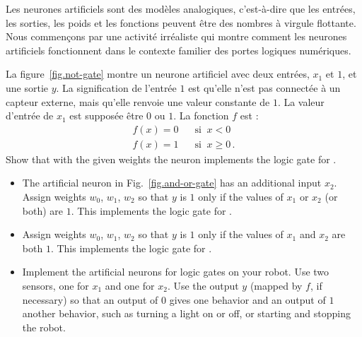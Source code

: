 Les neurones artificiels sont des modèles analogiques, c'est-à-dire que les entrées, les sorties, les poids et les fonctions peuvent être des nombres à virgule flottante. Nous commençons par une activité irréaliste qui montre comment les neurones artificiels fonctionnent dans le contexte familier des portes logiques numériques.

La figure~\ref{fig.not-gate} montre un neurone artificiel avec deux entrées, $x_1$ et $1$, et une sortie $y$. La signification de l'entrée $1$ est qu'elle n'est pas connectée à un capteur externe, mais qu'elle renvoie une valeur constante de $1$. La valeur d'entrée de $x_1$ est supposée être $0$ ou $1$. La fonction $f$ est :
\[
\begin{array}{ll}
f(x) = 0 & \;\;\;\textrm{si} \;\; x < 0\\
f(x) = 1 & \;\;\;\textrm{si} \;\; x \geq 0\,.
\end{array}
\]
Show that with the given weights the neuron implements the logic gate for .

\begin{framed}
\begin{itemize}
\item The artificial neuron in Fig.~\ref{fig.and-or-gate} has an additional input $x_2$. Assign weights $w_0$, $w_1$, $w_2$ so that $y$ is $1$ only if the values of $x_1$ or $x_2$ (or both) are $1$. This implements the logic gate for  .
\item Assign weights $w_0$, $w_1$, $w_2$ so that $y$ is $1$ only if the values of $x_1$ and $x_2$ are both $1$. This implements the logic gate for .
\item Implement the artificial neurons for logic gates on your robot. Use two sensors, one for $x_1$ and one for $x_2$. Use the output $y$ (mapped by $f$, if necessary) so that an output of $0$ gives one behavior and an output of $1$ another behavior, such as turning a light on or off, or starting and stopping the robot.
\end{itemize}
\end{framed}

